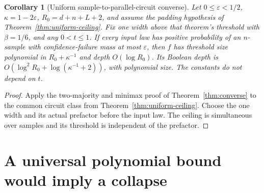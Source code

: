 \documentclass[11pt]{article}
\newtheorem{corollary}[theorem]{Corollary}
\theoremstyle{remark}
\begin{document}
\begin{corollary}[Uniform sample-to-parallel-circuit converse]
\label{cor:uniform-converse}
Let $0\le\varepsilon<1/2$, $\kappa=1-2\varepsilon$,
$R_0=d+n+L+2$, and assume the padding hypothesis of
Theorem~\ref{thm:uniform-ceiling}.
Fix one width above that theorem's
threshold with $\beta=1/6$, and any $0<t\le1$.
If every input law has positive probability of an
$n$-sample with confidence-failure mass at most
$\varepsilon$, then $f$ has threshold size polynomial
in $R_0+\kappa^{-1}$ and depth $O(\log R_0)$.
Its Boolean depth is
$O(\log^2R_0+\log(\kappa^{-1}+2))$, with polynomial size.
The constants do not depend on $t$.
\end{corollary}
\begin{proof}
Apply the two-majority and minimax proof of
Theorem~\ref{thm:converse} to the common circuit class
from Theorem~\ref{thm:uniform-ceiling}.
Choose the one width and its actual prefactor before
the input law. The ceiling is simultaneous over samples
and its threshold is independent of the prefactor.
\end{proof}

\section{A universal polynomial bound would imply a collapse}
\end{document}
